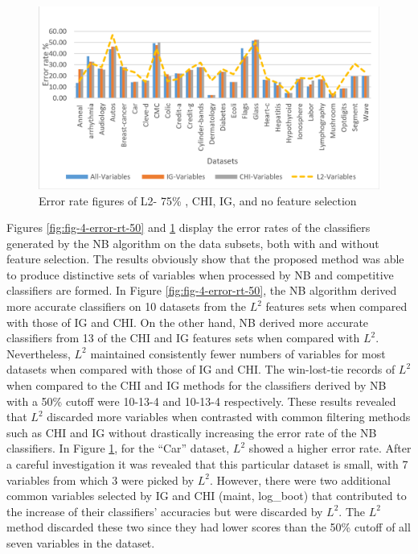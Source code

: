 \documentclass[review]{elsarticle}
\begin{document}
\begin{figure}[h]
	\centering
	\includegraphics[width=0.8\linewidth]{figs/fig_5_error_rt_75.png}
	\caption[fig-5-error-rt-75]{Error rate figures of L2- 75\% , CHI, IG, and no feature selection  }
	\label{fig:fig_5_error_rt_75}
\end{figure}


Figures \ref{fig:fig-4-error-rt-50} and \ref{fig:fig_5_error_rt_75} display the error rates of the classifiers generated by the NB algorithm on the data subsets, both with and without feature selection. The results obviously show that the proposed method was able to produce distinctive sets of variables when processed by NB and competitive classifiers are formed. In Figure \ref{fig:fig-4-error-rt-50}, the NB algorithm derived more accurate classifiers on 10 datasets from the $ L^2 $ features sets when compared with those of IG and CHI. On the other hand, NB derived more accurate classifiers from 13 of the CHI and IG features sets when compared with $ L^2 $. Nevertheless, $ L^2 $ maintained consistently fewer numbers of variables for most datasets when compared with those of IG and CHI. The win-lost-tie records of $ L^2 $ when compared to the CHI and IG methods for the classifiers derived by NB with a 50\% cutoff were 10-13-4 and 10-13-4 respectively. These results revealed that $ L^2 $ discarded more variables when contrasted with common filtering methods such as CHI and IG without drastically increasing the error rate of the NB classifiers. In Figure \ref{fig:fig_5_error_rt_75}, for the “Car” dataset, $ L^2 $ showed a higher error rate. After a careful investigation it was revealed that this particular dataset is small, with 7 variables from which 3 were picked by $ L^2 $. However, there were two additional common variables selected by IG and CHI (maint, log\_boot) that contributed to the increase of their classifiers’ accuracies but were discarded by $ L^2 $. The $ L^2 $ method discarded these two since they had lower scores than the 50\% cutoff of all seven variables in the dataset. 
\end{document}
